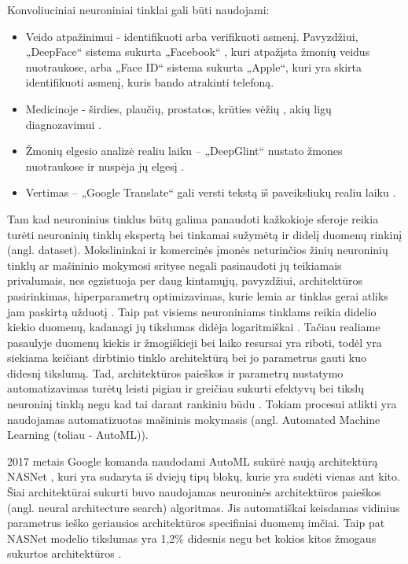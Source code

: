 \documentclass{VUMIFPSbakalaurinis}
\begin{document}
Konvoliuciniai neuroniniai tinklai gali būti naudojami:
\begin{itemize}
    \item Veido atpažinimui - identifikuoti arba verifikuoti asmenį. Pavyzdžiui, „DeepFace“ sistema sukurta „Facebook“ \cite{Taigman:2014:DCG:2679600.2680208}, kuri atpažįsta žmonių veidus nuotraukose, 
arba „Face ID“ sistema sukurta „Apple“, kuri yra skirta identifikuoti asmenį, kuris bando atrakinti telefoną. 
    \item Medicinoje - širdies, plaučių, prostatos, krūties vėžių \cite{cancer}, akių ligų diagnozavimui \cite{eyedis}.
    \item Žmonių elgesio analizė realiu laiku – „DeepGlint“ nustato žmones nuotraukose ir nuspėja jų elgesį \cite{deepGlint}.
    \item Vertimas – „Google Translate“ gali versti tekstą iš paveiksliukų realiu laiku \cite{Raschka:2015:PML:2886323}.
\end{itemize}

Tam kad neuroninius tinklus būtų galima panaudoti kažkokioje sferoje reikia turėti neuroninių tinklų ekspertą bei tinkamai sužymėtą ir didelį duomenų rinkinį (angl. dataset). 
Mokslininkai ir komercinės įmonės neturinčios žinių neuroninių tinklų ar mašininio mokymosi srityse negali pasinaudoti jų teikiamais privalumais, nes egzistuoja per daug kintamųjų, pavyzdžiui, architektūros pasirinkimas, hiperparametrų optimizavimas, 
kurie lemia ar tinklas gerai atliks jam paskirtą užduotį \cite{14f00e7a0861477a81f65b5c51f660f4, DBLP:journals/corr/abs-1902-06827}. Taip pat visiems neuroniniams tinklams reikia didelio kiekio duomenų, kadanagi jų tikslumas didėja logaritmiškai \cite{DBLP:journals/corr/ChoLSCD15, DBLP:journals/corr/SunSSG17}. 
Tačiau realiame pasaulyje duomenų kiekis ir žmogiškieji bei laiko resursai yra riboti, todėl yra siekiama keičiant dirbtinio tinklo architektūrą bei jo parametrus gauti kuo didesnį tikslumą. Tad, architektūros paieškos ir parametrų 
nustatymo automatizavimas turėtų leisti pigiau ir greičiau sukurti efektyvų bei tikslų neuroninį tinklą negu kad tai darant rankiniu būdu \cite{DBLP:journals/corr/RealMSSSLK17}.
Tokiam procesui atlikti yra naudojamas automatizuotas mašininis mokymasis (angl. Automated Machine Learning (toliau - AutoML)).

2017 metais Google komanda naudodami AutoML sukūrė naują architektūrą NASNet \cite{DBLP:journals/corr/ZophVSL17}, kuri yra sudaryta iš dviejų tipų blokų, kurie yra sudėti vienas ant kito. 
Šiai architektūrai sukurti buvo naudojamas neuroninės architektūros paieškos (angl. neural architecture search) algoritmas. Jis automatiškai keisdamas vidinius parametrus ieško geriausios architektūros specifiniai duomenų imčiai.
Taip pat NASNet modelio tikslumas yra 1,2\% didesnis negu bet kokios kitos žmogaus sukurtos architektūros \cite{DBLP:journals/corr/ZophVSL17}.
\end{document}
